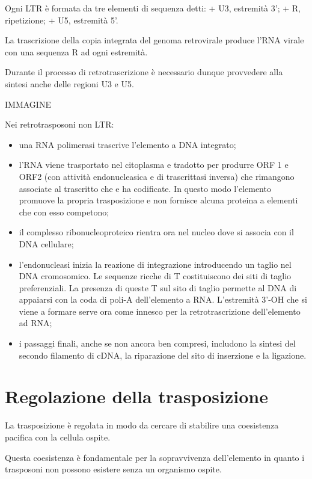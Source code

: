 \documentclass[11pt]{book}
\begin{document}
Ogni LTR è formata da tre elementi di sequenza detti: + U3, estremità
3'; + R, ripetizione; + U5, estremità 5'.

La trascrizione della copia integrata del genoma retrovirale produce
l'RNA virale con una sequenza R ad ogni estremità.

Durante il processo di retrotrascrizione è necessario dunque provvedere
alla sintesi anche delle regioni U3 e U5.

IMMAGINE

Nei retrotrasposoni non LTR:

\begin{itemize}
\itemsep1pt\parskip0pt
\item
  una RNA polimerasi trascrive l'elemento a DNA integrato;
\item
  l'RNA viene trasportato nel citoplasma e tradotto per produrre ORF 1 e
  ORF2 (con attività endonucleasica e di trascrittasi inversa) che
  rimangono associate al trascritto che e ha codificate. In questo modo
  l'elemento promuove la propria trasposizione e non fornisce alcuna
  proteina a elementi che con esso competono;
\item
  il complesso ribonucleoproteico rientra ora nel nucleo dove si associa
  con il DNA cellulare;
\item
  l'endonucleasi inizia la reazione di integrazione introducendo un
  taglio nel DNA cromosomico. Le sequenze ricche di T costituiscono dei
  siti di taglio preferenziali. La presenza di queste T sul sito di
  taglio permette al DNA di appaiarsi con la coda di poli-A
  dell'elemento a RNA. L'estremità 3'-OH che si viene a formare serve
  ora come innesco per la retrotrascrizione dell'elemento ad RNA;
\item
  i passaggi finali, anche se non ancora ben compresi, includono la
  sintesi del secondo filamento di cDNA, la riparazione del sito di
  inserzione e la ligazione.
\end{itemize}

\section{Regolazione della
trasposizione}\label{regolazione-della-trasposizione}

La trasposizione è regolata in modo da cercare di stabilire una
coesistenza pacifica con la cellula ospite.

Questa coesistenza è fondamentale per la sopravvivenza dell'elemento in
quanto i trasposoni non possono esistere senza un organismo ospite.
\end{document}
